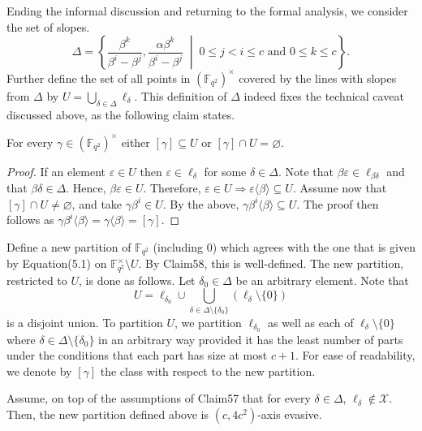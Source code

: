 Ending the informal discussion and returning to the formal analysis, we consider the set of slopes.
\begin{equation}\Delta=\left\{\frac{\beta^k}{\beta^i-\beta^j},\frac{\alpha\beta^k}{\beta^i-\beta^j}\;\middle|\;0\leq j<i\leq c\text{ and }0\leq k\leq c\right\}.\tag{5.4}\end{equation}
Further define the set of all points in $(\mathbb F_{q^2})^\times$ covered by the lines with slopes from $\Delta$ by $U=\bigcup_{\delta\in\Delta}\ell_\delta$. This definition of $\Delta$ indeed fixes the technical caveat discussed above, as the following claim states.
\begin{ntclaim}
For every $\gamma\in(\mathbb F_{q^2})^\times$ either $[\gamma]\subseteq U$ or $[\gamma]\cap U=\varnothing$.
\end{ntclaim}
\begin{proof}
If an element $\varepsilon\in U$ then $\varepsilon\in\ell_\delta$ for some $\delta\in\Delta$. Note that $\beta\varepsilon\in\ell_{\beta\delta}$ and that $\beta\delta\in\Delta$. Hence, $\beta\varepsilon\in U$. Therefore, $\varepsilon\in U\Longrightarrow\varepsilon\langle\beta\rangle\subseteq U$. Assume now that $[\gamma]\cap U\ne\varnothing$, and take $\gamma\beta^i\in U$. By the above, $\gamma\beta^i\langle\beta\rangle\subseteq U$. The proof then follows as $\gamma\beta^i\langle\beta\rangle=\gamma\langle\beta\rangle=[\gamma]$.
\end{proof}
Define a new partition of $\mathbb F_{q^2}$ (including $0$) which agrees with the one that is given by Equation(5.1) on $\mathbb F_{q^2}^\times\setminus U$. By Claim58, this is well-defined. The new partition, restricted to $U$, is done as follows. Let $\delta_0\in\Delta$ be an arbitrary element. Note that
\[U=\ell_{\delta_0}\cup\bigcup_{\delta\in\Delta\setminus\{\delta_0\}}(\ell_\delta\setminus\{0\})\]
is a disjoint union. To partition $U$, we partition $\ell_{\delta_0}$ as well as each of $\ell_\delta\setminus\{0\}$ where $\delta\in\Delta\setminus\{\delta_0\}$ in an arbitrary way provided it has the least number of parts under the conditions that each part has size at most $c+1$. For ease of readability, we denote by $[\gamma]$ the class with respect to the new partition.
\begin{ntclaim}
Assume, on top of the assumptions of Claim57 that for every $\delta\in\Delta$, $\ell_\delta\notin\mathcal X$. Then, the new partition defined above is $(c,4c^2)$-axis evasive.
\end{ntclaim}

